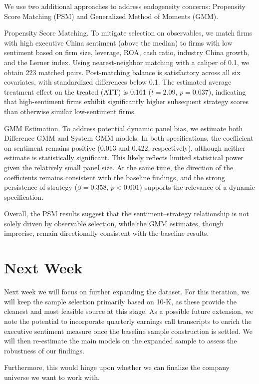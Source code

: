 \documentclass{article}
\begin{document}
We use two additional approaches to address endogeneity concerns:
Propensity Score Matching (PSM) and Generalized Method of Moments (GMM).

Propensity Score Matching. To mitigate selection on observables, we
match firms with high executive China sentiment (above the median) to
firms with low sentiment based on firm size, leverage, ROA, cash ratio,
industry China growth, and the Lerner index. Using nearest-neighbor
matching with a caliper of 0.1, we obtain 223 matched pairs.
Post-matching balance is satisfactory across all six covariates, with
standardized differences below 0.1. The estimated average treatment
effect on the treated (ATT) is 0.161 ($t=2.09$, $p=0.037$), indicating that
high-sentiment firms exhibit significantly higher subsequent strategy
scores than otherwise similar low-sentiment firms.

GMM Estimation. To address potential dynamic panel bias, we estimate
both Difference GMM and System GMM models. In both specifications, the
coefficient on sentiment remains positive (0.013 and 0.422,
respectively), although neither estimate is statistically significant.
This likely reflects limited statistical power given the relatively
small panel size. At the same time, the direction of the coefficients
remains consistent with the baseline findings, and the strong
persistence of strategy ($\beta = 0.358$, $p<0.001$)
supports the relevance of a dynamic specification.

Overall, the PSM results suggest that the sentiment--strategy
relationship is not solely driven by observable selection, while the GMM
estimates, though imprecise, remain directionally consistent with the
baseline results.

\section{Next Week}\label{next-week}

Next week we will focus on further expanding the dataset. For this
iteration, we will keep the sample selection primarily based on 10-K, as
these provide the cleanest and most feasible source at this stage. As a
possible future extension, we note the potential to incorporate
quarterly earnings call transcripts to enrich the executive sentiment
measure once the baseline sample construction is settled. We will then
re-estimate the main models on the expanded sample to assess the
robustness of our findings.

Furthermore, this would hinge upon whether we can finalize the company
universe we want to work with.
\end{document}
